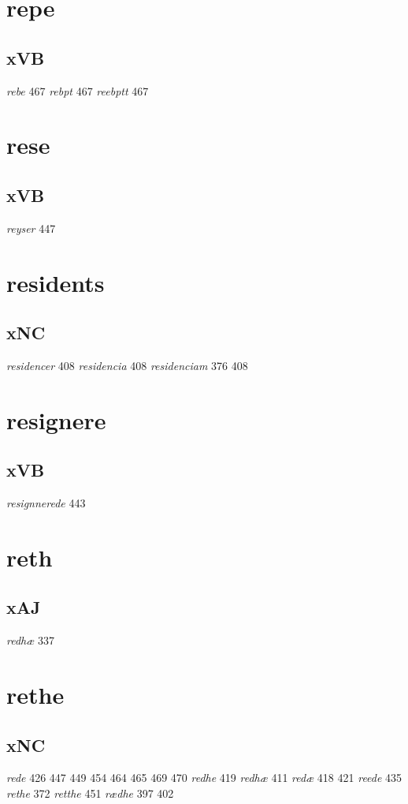 \documentclass[a4paper,twocolumn]{article}
\begin{document}
\section{repe}
\label{sec:org87d686f}
\subsection{xVB}
\label{sec:org52ba9e5}
\emph{rebe} 467 \emph{rebpt} 467 \emph{reebptt} 467 
\section{rese}
\label{sec:org67ce7e1}
\subsection{xVB}
\label{sec:org60cff97}
\emph{reyser} 447 
\section{residents}
\label{sec:org1dee7f1}
\subsection{xNC}
\label{sec:org0d45e9d}
\emph{residencer} 408 \emph{residencia} 408 \emph{residenciam} 376 408 
\section{resignere}
\label{sec:org4b05bad}
\subsection{xVB}
\label{sec:org11a4e9d}
\emph{resignnerede} 443 
\section{reth}
\label{sec:orgd5df37b}
\subsection{xAJ}
\label{sec:org2af282d}
\emph{redhæ} 337 
\section{rethe}
\label{sec:org5b7be22}
\subsection{xNC}
\label{sec:orge073a03}
\emph{rede} 426 447 449 454 464 465 469 470 \emph{redhe} 419 \emph{redhæ} 411 \emph{redæ} 418 421 \emph{reede} 435 \emph{rethe} 372 \emph{retthe} 451 \emph{rædhe} 397 402 
\end{document}
